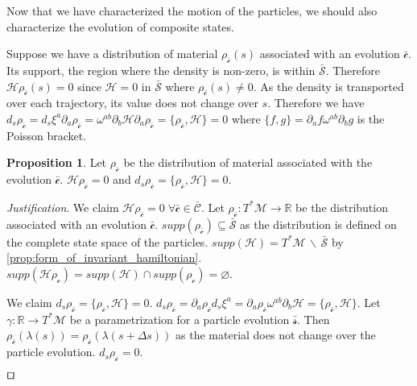 \documentclass[smallextended]{svjour3}
\numberwithin{equation}{section}
\newenvironment{justification}{\emph{Justification}.}{\hfill\(\qed\)}
\theoremstyle{definition}
\newtheorem{prop}[equation]{Proposition}
\newenvironment{justification}{\emph{Justification}.}{\qed}
\begin{document}
Now that we have characterized the motion of the particles, we should also characterize the evolution of composite states.

Suppose we have a distribution of material $\rho_{\bar{\mathcal{c}}}(s)$ associated with an evolution $\bar{\mathcal{c}}$. Its support, the region where the density is non-zero, is within $\bar{\mathcal{S}}$. Therefore  $\mathcal{H} \rho_{\bar{\mathcal{c}}}(s) = 0$ since $\mathcal{H} = 0$ in $\bar{\mathcal{S}}$ where $\rho_{\bar{\mathcal{c}}}(s) \neq 0$. As the density is transported over each trajectory, its value does not change over $s$. Therefore we have $d_s \rho_{\bar{\mathcal{c}}}= d_s \xi^a \partial_a \rho_{\bar{\mathcal{c}}} = \omega^{ab} \partial_b \mathcal{H} \partial_a \rho_{\bar{\mathcal{c}}} = \{ \rho_{\bar{\mathcal{c}}}, \mathcal{H} \} = 0$ where $\{f , g\} = \partial_a f \omega^{ab} \partial_b g$ is the Poisson bracket.

\begin{prop}\label{prop:relativistic_state_evolution}
	Let $\rho_{\bar{\mathcal{c}}}$ be the distribution of material associated with the evolution $\bar{\mathcal{c}}$. $\mathcal{H} \rho_{\bar{\mathcal{c}}} = 0$ and $d_s \rho_{\bar{\mathcal{c}}} = \{ \rho_{\bar{\mathcal{c}}}, \mathcal{H} \} = 0$.
\end{prop}

\begin{justification}
	We claim $\mathcal{H} \rho_{\bar{\mathcal{c}}} = 0 \; \forall \bar{\mathcal{c}} \in \bar{\mathcal{C}}$. Let $\rho_{\bar{\mathcal{c}}} : T^*\mathcal{M} \rightarrow \mathbb{R}$ be the distribution associated with an evolution $\bar{\mathcal{c}}$. $supp(\rho_{\bar{\mathcal{c}}}) \subseteq \bar{\mathcal{S}}$ as the distribution is defined on the complete state space of the particles. $supp(\mathcal{H}) = T^*\mathcal{M} \,\backslash\, \bar{\mathcal{S}}$ by \ref{prop:form_of_invariant_hamiltonian}. $supp(\mathcal{H} \rho_\mathcal{c}) = supp(\mathcal{H}) \cap supp(\rho_\mathcal{c}) = \varnothing$.
	
	We claim $d_s \rho_{\bar{\mathcal{c}}} = \{ \rho_{\bar{\mathcal{c}}}, \mathcal{H} \} = 0$. $d_s \rho_{\bar{\mathcal{c}}}= \partial_a \rho_{\bar{\mathcal{c}}} d_s \xi^a = \partial_a \rho_{\bar{\mathcal{c}}} \omega^{ab} \partial_b \mathcal{H} = \{ \rho_{\bar{\mathcal{c}}}, \mathcal{H} \}$. Let $\gamma : \mathbb{R} \rightarrow T^*\mathcal{M}$ be a parametrization for a particle evolution $\bar{\mathcal{s}}$. Then $\rho_{\bar{\mathcal{c}}}(\lambda(s)) = \rho_{\bar{\mathcal{c}}}(\lambda(s + \Delta s))$ as the material does not change over the particle evolution. $d_s \rho_{\bar{\mathcal{c}}} = 0$.
	
\end{justification}
\end{document}
